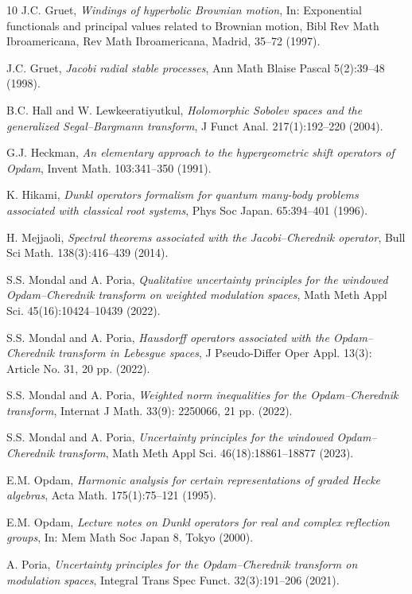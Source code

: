 \documentclass[a4paper,11pt, reqno]{amsart}
\theoremstyle{plain}
\theoremstyle{definition}
\theoremstyle{remark}
\begin{document}
\begin{thebibliography}{10}
J.C. Gruet, {\it Windings of hyperbolic Brownian motion}, In: Exponential functionals and principal values related to Brownian motion, Bibl Rev Math Ibroamericana, Rev Math Ibroamericana, Madrid, 35--72 (1997).

J.C. Gruet, {\it Jacobi radial stable processes}, Ann Math Blaise Pascal 5(2):39--48 (1998).

B.C. Hall and W. Lewkeeratiyutkul, {\it Holomorphic Sobolev spaces and the generalized Segal--Bargmann transform}, J Funct Anal. 217(1):192--220 (2004).

G.J. Heckman, {\it An elementary approach to the hypergeometric shift operators of Opdam}, Invent Math. 103:341--350 (1991).

K. Hikami, {\it Dunkl operators formalism for quantum many-body problems associated with classical root systems}, Phys Soc Japan. 65:394--401 (1996).

H. Mejjaoli, {\it  Spectral theorems associated with the Jacobi--Cherednik operator}, Bull Sci Math. 138(3):416--439 (2014).

S.S. Mondal and A. Poria, {\it Qualitative uncertainty principles for the windowed Opdam--Cherednik transform on weighted modulation spaces}, Math Meth Appl Sci. 45(16):10424--10439 (2022).

S.S. Mondal and A. Poria, {\it Hausdorff operators associated with the Opdam--Cherednik transform in Lebesgue spaces}, J Pseudo-Differ Oper Appl. 13(3): Article No. 31, 20 pp. (2022).

S.S. Mondal and A. Poria, {\it Weighted norm inequalities for the Opdam--Cherednik transform}, Internat J Math. 33(9): 2250066, 21 pp. (2022).

S.S. Mondal and A. Poria, {\it Uncertainty principles for the windowed Opdam--Cherednik transform}, Math Meth Appl Sci. 46(18):18861--18877 (2023).

E.M. Opdam, {\it Harmonic analysis for certain representations of graded Hecke algebras}, Acta Math. 175(1):75--121 (1995).

E.M. Opdam, {\it Lecture notes on Dunkl operators for real and complex reflection groups}, In: Mem Math Soc Japan 8, Tokyo (2000).

A. Poria, {\it Uncertainty principles for the Opdam--Cherednik transform on modulation spaces}, Integral Trans Spec Funct. 32(3):191--206 (2021).


\end{thebibliography}
\end{document}
